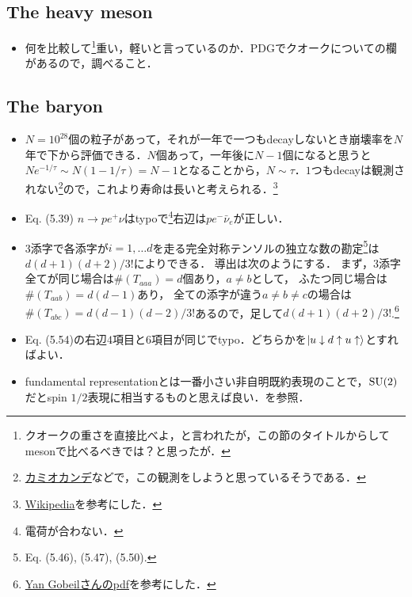 \subsection{The heavy meson}
\begin{itemize}
		\item 何を比較して\footnote{クオークの重さを直接比べよ，と言われたが，この節のタイトルからしてmesonで比べるべきでは？と思ったが．}重い，軽いと言っているのか．PDGでクオークについての欄があるので，調べること．
\end{itemize}
\subsection{The baryon}
\begin{itemize}
		\item $N=10^{28} $個の粒子があって，それが一年で一つもdecayしないとき崩壊率を$N $年で下から評価できる．$N $個あって，一年後に$N-1 $個になると思うと$Ne^{-1/\tau} \sim N( 1 - 1/\tau) = N-1 $となることから，$N\sim \tau $．$1 $つもdecayは観測されない\footnote{\href{https://www-sk.icrr.u-tokyo.ac.jp/sk/about/research/}{カミオカンデ}などで，この観測をしようと思っているそうである．}ので，これより寿命は長いと考えられる．\footnote{\href{https://ja.wikipedia.org/wiki/\%E9\%99\%BD\%E5\%AD\%90\#cite\_note-11}{Wikipedia}を参考にした．}
		\item Eq. (5.39) $n \to pe^{+}\nu $はtypoで\footnote{電荷が合わない．}右辺は$pe^{-}\bar{\nu}_e $が正しい．
		\item 3添字で各添字が$i=1, \ldots d $を走る完全対称テンソルの独立な数の勘定\footnote{Eq. (5.46), (5.47), (5.50).}は$d(d+1)(d+2)/3! $によりできる．
				導出は次のようにする．
				まず，$3 $添字全てが同じ場合は$\#(T_{aaa}) = d $個あり，$a\neq  b $として，
				ふたつ同じ場合は$\#(T_{aab}) = d(d-1)$あり，
				全ての添字が違う$a\neq b \neq c $の場合は$\#(T_{abc}) = d(d-1)(d-2)/3! $あるので，足して$d(d+1)(d+2)/3! $.\footnote{\href{http://www.physics.mcgill.ca/~yangob/symmetric\%20tensor.pdf}{Yan Gobeilさんのpdf}を参考にした．}
		\item Eq. (5.54)の右辺$4 $項目と$6 $項目が同じでtypo．どちらかを$\ket{u\downarrow d\uparrow u\uparrow} $とすればよい．
		\item fundamental representationとは一番小さい非自明既約表現のことで，$\mathrm{SU}(2) $だとspin $1/2 $表現に相当するものと思えば良い．\cite{BB03663366}を参照．
\end{itemize}
